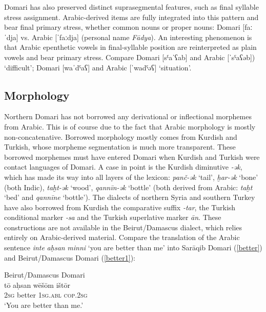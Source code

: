 \documentclass[output=paper]{langsci/langscibook}
\begin{document}
Domari has also preserved distinct suprasegmental features, such as final syllable stress assignment. Arabic-derived items are fully integrated into this pattern and bear final primary stress, whether common nouns or proper nouns: Domari [faːˈdja] vs. Arabic [ˈfaːdja] (personal name \textit{Fādya}). An interesting phenomenon is that Arabic epenthetic vowels in final-syllable position are reinterpreted as plain vowels and bear primary stress.  Compare Domari [sˤaˈʕab] and Arabic [ˈsˤaʕəb]) ‘difficult’; Domari [waˈdˤaʕ] and Arabic [ˈwadˤəʕ] ‘situation’.


 
 \subsection{Morphology}


Northern Domari has not borrowed any derivational or inflectional morphemes from Arabic. This is of course due to the fact that Arabic morphology is mostly non-concatenative. Borrowed morphology mostly comes from Kurdish and Turkish, whose morpheme segmentation is much more transparent. These borrowed morphemes must have entered Domari when Kurdish and Turkish were contact languages of Domari. A case in point is the Kurdish diminutive \textit{-ək}, which has made its way into all layers of the lexicon: \textit{panč-ək} ‘tail’, \textit{ḫar-ək} ‘bone’ (both Indic), \textit{taḫt-ək} ‘wood’, \textit{qannīn-ək} ‘bottle’ (both derived from Arabic: \textit{taḫt} ‘bed’ and \textit{qannīne} ‘bottle’). The dialects of northern Syria and southern Turkey have also borrowed from Kurdish the comparative suffix \textit{{}-tar}, the Turkish conditional marker \textit{{}-sa} and the Turkish superlative marker \textit{ān}. These constructions are not available in the Beirut/Damascus dialect, which relies entirely on Arabic-derived material. Compare the translation of the Arabic sentence \textit{inte} \textit{aḥsan} \textit{minni} ‘you are better than me’ into Sarāqib Domari (\ref{better}) and Beirut/Damascus Domari (\ref{better1}):

\ea 
{Beirut/Damascus Domari}\\ \label{better1}
\gll tō aḥsan wēšōm ištōr\\
 \textsc{2sg} better \textsc{1sg.abl} \textsc{cop.2sg} \\
\glt ‘You are better than me.’\\
\z
\end{document}
